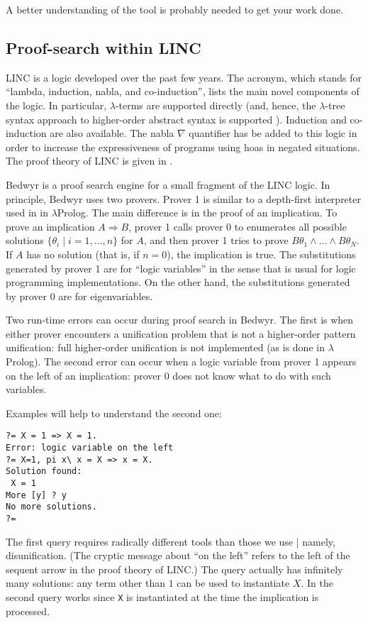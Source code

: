 \documentclass{article}
\begin{document}
A better understanding of the tool is probably needed to get your work
done. 

\subsection{Proof-search within LINC}
\label{psearch}

LINC is a logic developed over the past few years.  The acronym, which
stands for ``lambda, induction, nabla, and co-induction'', lists the
main novel components of the logic.  In particular, $\lambda$-terms
are supported directly (and, hence, the $\lambda$-tree syntax approach
to higher-order abstract syntax is supported \cite{miller00cl}).
Induction and co-induction are also available.  The nabla $\nabla$
quantifier has be added to this logic in order to increase the
expressiveness of programs using hoas in negated situations.  The
proof theory of LINC is given in \cite{miller05tocl,tiu04phd}.

Bedwyr is a proof search engine for a small fragment of the LINC
logic.  In principle, Bedwyr uses two provers.  Prover 1 is similar to
a depth-first interpreter used in in $\lambda$Prolog.  The main
difference is in the proof of an implication.  
To prove an implication $A\Rightarrow B$, prover 1  calls prover 0
to enumerates all possible solutions
$\{\theta_i\;|\;i=1,\ldots,n\}$ for $A$, 
and then prover 1 tries to prove $B\theta_1\wedge\dots\wedge B\theta_N$.
If $A$ has no solution (that is, if $n=0$), the implication is true.
The substitutions generated by prover 1 are for ``logic variables'' in
the sense that is usual for logic programming implementations.  On the
other hand, the substitutions generated by prover 0 are for
eigenvariables. 

Two run-time errors can occur during proof search in Bedwyr.  The first
is when either prover encounters a unification problem that is not a 
higher-order pattern unification: full higher-order unification is not
implemented (as is done in $\lambda$Prolog).  The second error can
occur when a logic variable from prover 1 appears on the left of an
implication: prover 0 does not know what to do with such variables.

Examples will help to understand the second one:
\begin{verbatim}
?= X = 1 => X = 1.
Error: logic variable on the left
?= X=1, pi x\ x = X => x = X.
Solution found:
 X = 1
More [y] ? y
No more solutions.
?= 
\end{verbatim}
The first query requires radically different tools than those we use |
namely, disunification. (The cryptic message about ``on the left''
refers to the left of the sequent arrow in the proof theory of LINC.)
The query actually has infinitely many solutions: any term other than
$1$ can be used to instantiate $X$.  In the second query works since
\verb.X. is instantiated at the time the implication is processed.
\end{document}
